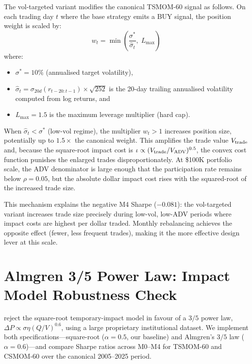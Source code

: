 \documentclass[12pt]{article}
\begin{document}
The vol-targeted variant modifies the canonical TSMOM-60 signal as
follows. On each trading day $t$ where the base strategy emits a BUY
signal, the position weight is scaled by:
\begin{equation}
  w_t = \min\!\left(\frac{\sigma^*}{\hat\sigma_t},\; L_{\max}\right)
  \label{eq:vol_target}
\end{equation}
where:
\begin{itemize}[nosep]
  \item $\sigma^* = 10\%$ (annualised target volatility),
  \item $\hat\sigma_t = \sigma_{20d}(r_{t-20:t-1}) \times \sqrt{252}$
    is the 20-day trailing annualised volatility computed from
    log returns, and
  \item $L_{\max} = 1.5$ is the maximum leverage multiplier (hard cap).
\end{itemize}

\noindent When $\hat\sigma_t < \sigma^*$ (low-vol regime), the
multiplier $w_t > 1$ increases position size, potentially up to
$1.5\times$ the canonical weight. This amplifies the trade value
$V_{\rm trade}$ and, because the square-root impact cost is
$\iota \propto (V_{\rm trade}/V_{\rm ADV})^{0.5}$, the convex
cost function punishes the enlarged trades disproportionately.
At \$100K portfolio scale, the ADV denominator is large enough
that the participation rate remains below $\rho = 0.05$, but the
absolute dollar impact cost rises with the squared-root of the
increased trade size.

This mechanism explains the negative M4 Sharpe ($-0.081$): the
vol-targeted variant increases trade size precisely during
low-vol, low-ADV periods where impact costs are highest per
dollar traded. Monthly rebalancing achieves the opposite effect
(fewer, less frequent trades), making it the more effective
design lever at this scale.

\section{Almgren 3/5 Power Law: Impact Model Robustness Check}
\label{app:power_law}

\citet{almgren2005direct} reject the square-root temporary-impact
model in favour of a $3/5$ power law, $\Delta P \propto \sigma\eta(Q/V)^{0.6}$,
using a large proprietary institutional dataset.
We implement both specifications---square-root ($\alpha = 0.5$, our
baseline) and Almgren's $3/5$ law ($\alpha = 0.6$)---and compare
Sharpe ratios across M0--M4 for TSMOM-60 and CSMOM-60 over the
canonical 2005--2025 period.
\end{document}
